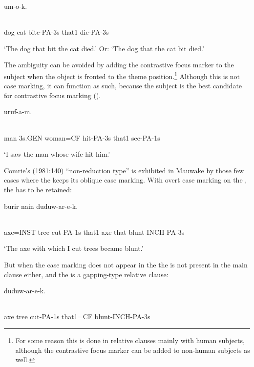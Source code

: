 \ea%
\label{ex:x1548}
  um-o-k. \\
      \\
\glt
\z

dog  cat  bite-PA-3s  that1  die-PA-3s

`The dog that bit the cat died.' Or: `The dog that the cat bit died.'

The ambiguity can be avoided by adding the contrastive focus marker to the subject when the object is fronted to the theme position.\footnote{For some reason this is done in relative clauses mainly with human subjects, although the contrastive focus marker can be added to non-human subjects as well.}  Although this is not case marking, it can function as such, because the subject is the best candidate for contrastive focus marking ().

\ea%
\label{ex:x1549}
\gll [Mua  ona  emeria=ke  aruf-a-k  nain]  uruf-a-m. \\
      \\
\glt
\z

man  3s.GEN  woman=CF  hit-PA-3s  that1  see-PA-1s

`I saw the man whose wife hit him.'

Comrie's (1981:140) ``non-reduction type'' is exhibited in Mauwake by those few cases where the  keeps its oblique case marking. With overt case marking on the , the  has to be retained:

\ea%
\label{ex:x1544}
\gll [\textbf{Burir=iw}  nomokowa  war-em  nain,]  burir  nain  duduw-ar-e-k. \\
      \\
\glt
\z

axe=INST  tree  cut-PA-1s  that1  axe  that  blunt-INCH-PA-3s

`The axe with which I cut trees became blunt.'

But when the case marking does not appear in the  the  is not present in the main clause either, and the  is a gapping-type relative clause:

\ea%
\label{ex:x1541}
\gll [\textbf{Burir}  nomokowa  war-e-m  nain=ke]  duduw-ar-e-k. \\
      \\
\glt
\z

axe  tree  cut-PA-1s  that1=CF  blunt-INCH-PA-3s

